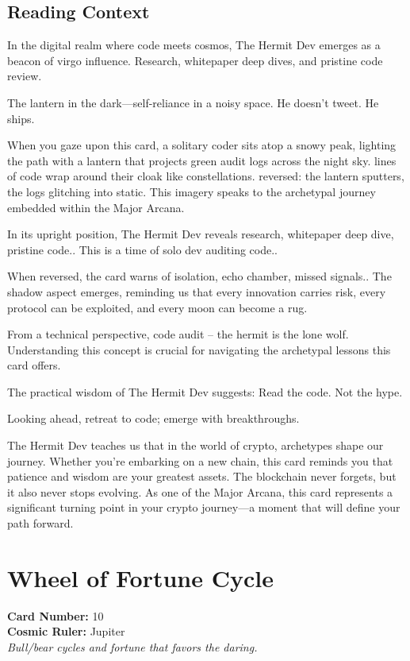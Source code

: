 \documentclass[11pt,oneside]{book}
\begin{document}
\begin{minipage}[t]{0.55\textwidth}
  \subsection*{Reading Context}
  In the digital realm where code meets cosmos, The Hermit Dev emerges as a beacon of virgo influence. Research, whitepaper deep dives, and pristine code review.

  The lantern in the dark—self-reliance in a noisy space. He doesn't tweet. He ships.

  When you gaze upon this card, a solitary coder sits atop a snowy peak, lighting the path with a lantern that projects green audit logs across the night sky. lines of code wrap around their cloak like constellations. reversed: the lantern sputters, the logs glitching into static. This imagery speaks to the archetypal journey embedded within the Major Arcana.

  In its upright position, The Hermit Dev reveals research, whitepaper deep dive, pristine code.. This is a time of solo dev auditing code..

  When reversed, the card warns of isolation, echo chamber, missed signals.. The shadow aspect emerges, reminding us that every innovation carries risk, every protocol can be exploited, and every moon can become a rug.

  From a technical perspective, code audit – the hermit is the lone wolf. Understanding this concept is crucial for navigating the archetypal lessons this card offers.

  The practical wisdom of The Hermit Dev suggests: Read the code. Not the hype.

  Looking ahead, retreat to code; emerge with breakthroughs.

  The Hermit Dev teaches us that in the world of crypto, archetypes shape our journey. Whether you're embarking on a new chain, this card reminds you that patience and wisdom are your greatest assets. The blockchain never forgets, but it also never stops evolving. As one of the Major Arcana, this card represents a significant turning point in your crypto journey—a moment that will define your path forward.

\end{minipage}

\newpage
\section*{Wheel of Fortune Cycle}

\begin{minipage}[t]{0.55\textwidth}
  \vspace{0pt}
  \textbf{Card Number:} 10\\  \textbf{Cosmic Ruler:} Jupiter\\  \textit{Bull/bear cycles and fortune that favors the daring.}
\end{minipage}
\end{document}
